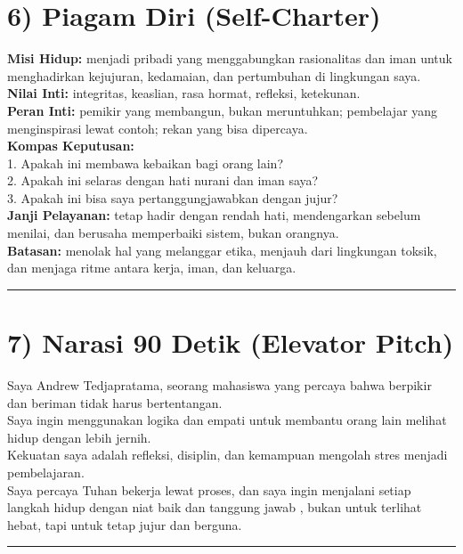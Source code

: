 \documentclass[
  letterpaper,
  DIV=11,
  numbers=noendperiod]{scrreprt}
\begin{document}
\section{6) Piagam Diri (Self-Charter)}\label{piagam-diri-self-charter}

\textbf{Misi Hidup:} menjadi pribadi yang menggabungkan rasionalitas dan
iman untuk menghadirkan kejujuran, kedamaian, dan pertumbuhan di
lingkungan saya.\\
\textbf{Nilai Inti:} integritas, keaslian, rasa hormat, refleksi,
ketekunan.\\
\textbf{Peran Inti:} pemikir yang membangun, bukan meruntuhkan;
pembelajar yang menginspirasi lewat contoh; rekan yang bisa dipercaya.\\
\textbf{Kompas Keputusan:}\\
1. Apakah ini membawa kebaikan bagi orang lain?\\
2. Apakah ini selaras dengan hati nurani dan iman saya?\\
3. Apakah ini bisa saya pertanggungjawabkan dengan jujur?\\
\textbf{Janji Pelayanan:} tetap hadir dengan rendah hati, mendengarkan
sebelum menilai, dan berusaha memperbaiki sistem, bukan orangnya.\\
\textbf{Batasan:} menolak hal yang melanggar etika, menjauh dari
lingkungan toksik, dan menjaga ritme antara kerja, iman, dan keluarga.

\begin{center}\rule{0.5\linewidth}{0.5pt}\end{center}

\section{7) Narasi 90 Detik (Elevator
Pitch)}\label{narasi-90-detik-elevator-pitch}

Saya Andrew Tedjapratama, seorang mahasiswa yang percaya bahwa berpikir
dan beriman tidak harus bertentangan.\\
Saya ingin menggunakan logika dan empati untuk membantu orang lain
melihat hidup dengan lebih jernih.\\
Kekuatan saya adalah refleksi, disiplin, dan kemampuan mengolah stres
menjadi pembelajaran.\\
Saya percaya Tuhan bekerja lewat proses, dan saya ingin menjalani setiap
langkah hidup dengan niat baik dan tanggung jawab , bukan untuk terlihat
hebat, tapi untuk tetap jujur dan berguna.

\begin{center}\rule{0.5\linewidth}{0.5pt}\end{center}
\end{document}
